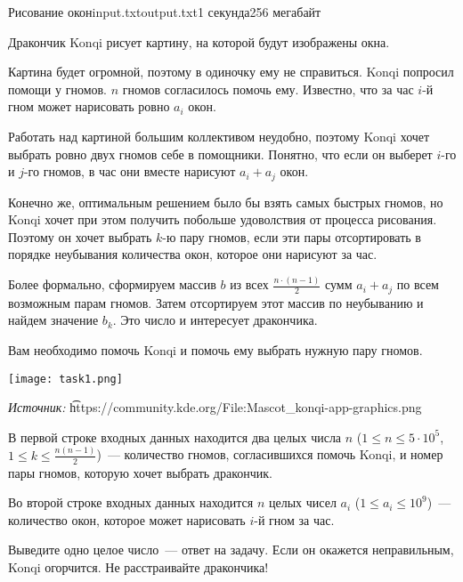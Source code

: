 \begin{problem}{Рисование окон}{input.txt}{output.txt}{1 секунда}{256 мегабайт}

Дракончик Konqi рисует картину, на которой будут изображены окна.

Картина будет огромной, поэтому в одиночку ему не справиться. Konqi попросил помощи у гномов. $n$ гномов согласилось помочь ему. Известно, что за час $i$-й гном может нарисовать ровно $a_i$ окон.

Работать над картиной большим коллективом неудобно, поэтому Konqi хочет выбрать ровно двух гномов себе в помощники. Понятно, что если он выберет $i$-го и $j$-го гномов, в час они вместе нарисуют $a_i + a_j$ окон.

Конечно же, оптимальным решением было бы взять самых быстрых гномов, но Konqi хочет при этом получить побольше удоволствия от процесса рисования. Поэтому он хочет выбрать $k$-ю пару гномов, если эти пары отсортировать в порядке неубывания количества окон, которое они нарисуют за час.

Более формально, сформируем массив $b$ из всех $\frac{n\cdot(n-1)}2$ сумм $a_i + a_j$ по всем возможным парам гномов. Затем отсортируем этот массив по неубыванию и найдем значение $b_k$. Это число и интересует дракончика.

Вам необходимо помочь Konqi и помочь ему выбрать нужную пару гномов.

\vspace{-3.5em}

\begin{center}
	\texttt{[image: task1.png]}
	
	\scriptsize \textit{Источник:} \t{https://community.kde.org/File:Mascot\_konqi-app-graphics.png}
\end{center}

\InputFile

В первой строке входных данных находится два целых числа $n$ ($1 \le n \le 5\cdot10^5$, $1 \le k \le \frac{n(n-1)}2$)~--- количество гномов, согласившихся помочь Konqi, и номер пары гномов, которую хочет выбрать дракончик.

Во второй строке входных данных находится $n$ целых чисел $a_i$ ($1 \le a_i \le 10^9$)~--- количество окон, которое может нарисовать $i$-й гном за час.

\OutputFile

Выведите одно целое число~--- ответ на задачу. Если он окажется неправильным, Konqi огорчится. Не расстраивайте дракончика!


\end{problem}
